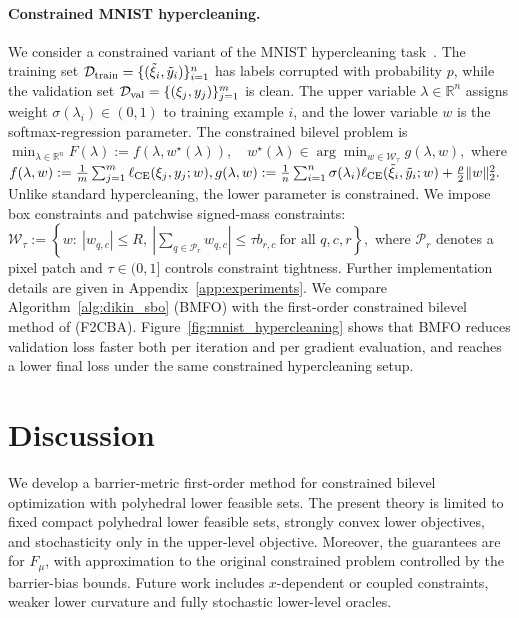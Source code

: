 \documentclass{article}
\begin{document}
\paragraph{Constrained MNIST hypercleaning.}
We consider a constrained variant of the MNIST hypercleaning task~\citep{deng2012mnist}. The
training set \(\mathcal D_{\rm train}=\{(\tilde\xi_i,\tilde y_i)\}_{i=1}^n\) has labels corrupted with
probability \(p\), while the validation set
\(\mathcal D_{\rm val}=\{(\xi_j,y_j)\}_{j=1}^m\) is clean. The upper variable
\(\lambda\in\mathbb R^n\) assigns weight \(\sigma(\lambda_i)\in(0,1)\) to training example \(i\),
and the lower variable \(w\) is the softmax-regression parameter. The constrained bilevel problem is
\(
\min_{\lambda\in\mathbb R^n} F(\lambda):=f(\lambda,w^\star(\lambda)),
\quad
w^\star(\lambda)\in\arg\min_{w\in\mathcal W_\tau} g(\lambda,w),\)
where \( f(\lambda,w):=\frac1m\sum_{j=1}^m \ell_{\rm CE}(\xi_j,y_j;w),
g(\lambda,w):=\frac1n\sum_{i=1}^n \sigma(\lambda_i)\ell_{\rm CE}(\tilde\xi_i,\tilde y_i;w)
+\frac{\rho}{2}\|w\|_2^2 .\)
Unlike standard hypercleaning, the lower parameter is constrained. We impose box constraints and
patchwise signed-mass constraints:
\(\mathcal W_\tau
:=
\left\{
w:\ |w_{q,c}|\le R,\ 
\left|\sum_{q\in\mathcal P_r}w_{q,c}\right|\le \tau b_{r,c}
\ \text{for all }q,c,r
\right\},\)
where \(\mathcal P_r\) denotes a pixel patch and \(\tau\in(0,1]\) controls constraint tightness. Further
implementation details are given in Appendix~\ref{app:experiments}. We compare
Algorithm~\ref{alg:dikin_sbo} (BMFO) with the first-order constrained bilevel method of
\citet{kornowski2024first} (F2CBA). Figure~\ref{fig:mnist_hypercleaning} shows that BMFO reduces
validation loss faster both per iteration and per gradient evaluation, and reaches a lower final loss
under the same constrained hypercleaning setup.


\section{Discussion}
\label{sec:discussion}

We develop a barrier-metric first-order method for constrained bilevel optimization with polyhedral
lower feasible sets. The present theory is limited to fixed compact polyhedral lower feasible sets, strongly convex lower
objectives, and stochasticity only in the upper-level objective. Moreover, the guarantees are for
\(F_\mu\), with approximation to the original constrained problem controlled by the barrier-bias
bounds. Future work includes \(x\)-dependent or coupled constraints, weaker lower curvature and
fully stochastic lower-level oracles.
\end{document}

